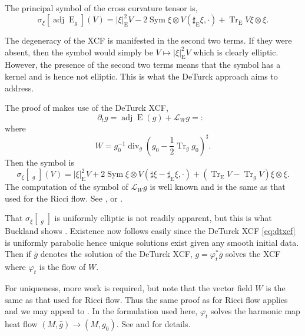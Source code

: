 \documentclass{cambridge7a}
\renewcommand{\~}{\tilde}
\renewcommand{\-}{\bar}
\newcommand{\8}{\infty}
\newcommand{\Lie}{\mathcal{L}}
\newcommand{\abs}[1]{\left\lvert{#1}\right\rvert}
\DeclareMathOperator{\Tr}{Tr}
\DeclareMathOperator{\dive}{div}
\DeclareMathOperator{\Ein}{E}
\DeclareMathOperator{\adj}{adj}
\DeclareMathOperator{\Sym}{Sym}
\DeclareMathOperator{\xcf}{\sigma}
\DeclareMathOperator{\dtxcf}{\xcf_{\operatorname{DT}}}
\begin{document}
\begin{lemma}
\label{lem:xcf_symbol}
The principal symbol of the cross curvature tensor is,
\[
\sigma_{\xi} [\adj\Ein_g] (V) = \abs{\xi}^2_{\Ein}V - 2 \Sym \xi \otimes V(\sharp_{\Ein}\xi, \cdot) + \Tr_{\Ein} V \xi \otimes \xi.
\]
\end{lemma}

The degeneracy of the XCF is manifested in the second two terms. If they were absent, then the symbol would simply be \(V \mapsto \abs{\xi}^2_{\Ein} V\) which is clearly elliptic. However, the presence of the second two terms means that the symbol has a kernel and is hence not elliptic. This is what the DeTurck approach aims to address.

The proof of  makes use of the DeTurck XCF,
\begin{equation}
\label{eq:dtxcf}
\partial_t g = \adj\Ein (g) + \Lie_W g =: \dtxcf
\end{equation}
where
\[
W = g_0^{-1} \dive_g \left(g_0 - \frac{1}{2}\Tr_g g_0\right)^{\sharp}.
\]
Then the symbol is
\begin{equation}
\label{eq:dtxcf_symbol}
\sigma_{\xi} [\dtxcf_g] (V) = \abs{\xi}^2_{\Ein}V + 2 \Sym \xi \otimes V(\sharp \xi - \sharp_{\Ein}\xi, \cdot) + \left(\Tr_{\Ein} V - \Tr_g V\right) \xi \otimes \xi.
\end{equation}
The computation of the symbol of \(\Lie_W g\) is well known and is the same as that used for the Ricci flow. See \cite{MR2207496}, \cite[Sections 3.3, 3.4]{MR2061425} or \cite[Chapter 5]{MR2265040}.

That \(\sigma_{\xi}[\dtxcf_g]\) is uniformly elliptic is not readily apparent, but this is what Buckland shows \cite{MR2207496}. Existence now follows easily since the DeTurck XCF \eqref{eq:dtxcf} is uniformly parabolic hence unique solutions exist given any smooth initial data. Then if \(\bar{g}\) denotes the solution of the DeTurck XCF, \(g = \varphi_t^{\ast} \bar{g}\) solves the XCF where \(\varphi_t\) is the flow of \(W\).

For uniqueness, more work is required, but note that the vector field \(W\) is the same as that used for Ricci flow. Thus the same proof as for Ricci flow applies and we may appeal to \cite[Section 6]{MR1375255}. In the formulation used here, \(\varphi_t\) solves the harmonic map heat flow \((M, \bar{g}) \to (M, g_0)\). See \cite[Section 5.2]{MR2265040} and \cite[Sections 3.3, 3.4]{MR2061425} for details.
\end{document}
